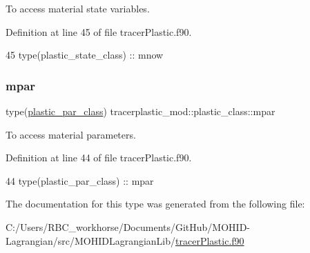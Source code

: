 To access material state variables. 



Definition at line 45 of file tracer\+Plastic.\+f90.


\begin{DoxyCode}
45         \textcolor{keywordtype}{type}(plastic\_state\_class) :: mnow
\end{DoxyCode}
\mbox{\label{structtracerplastic__mod_1_1plastic__class_aa7e8b3a74a085714eac5917aaa2fc8c6}} 
\subsubsection{\texorpdfstring{mpar}{mpar}}
{\footnotesize\ttfamily type(\mbox{\hyperlink{structtracerplastic__mod_1_1plastic__par__class}{plastic\+\_\+par\+\_\+class}}) tracerplastic\+\_\+mod\+::plastic\+\_\+class\+::mpar\hspace{0.3cm}{\ttfamily [private]}}



To access material parameters. 



Definition at line 44 of file tracer\+Plastic.\+f90.


\begin{DoxyCode}
44         \textcolor{keywordtype}{type}(plastic\_par\_class)   :: mpar
\end{DoxyCode}


The documentation for this type was generated from the following file\+:\begin{DoxyCompactItemize}
\item 
C\+:/\+Users/\+R\+B\+C\+\_\+workhorse/\+Documents/\+Git\+Hub/\+M\+O\+H\+I\+D-\/\+Lagrangian/src/\+M\+O\+H\+I\+D\+Lagrangian\+Lib/\mbox{\hyperlink{tracer_plastic_8f90}{tracer\+Plastic.\+f90}}\end{DoxyCompactItemize}
